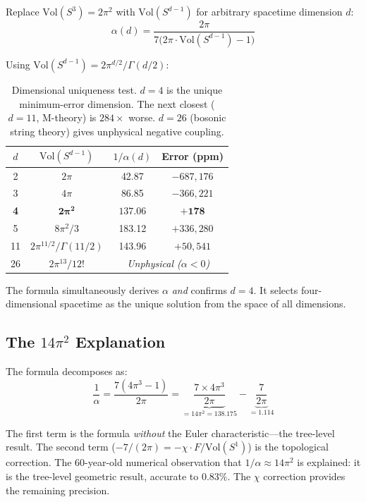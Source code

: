 \documentclass[12pt,a4paper]{article}
\theoremstyle{plain}
\theoremstyle{definition}
\begin{document}
Replace $\mathrm{Vol}(S^3) = 2\pi^2$ with $\mathrm{Vol}(S^{d-1})$ for arbitrary spacetime dimension $d$:
\begin{equation}
\alpha(d) = \frac{2\pi}{7\bigl(2\pi \cdot \mathrm{Vol}(S^{d-1}) - 1\bigr)}
\end{equation}

Using $\mathrm{Vol}(S^{d-1}) = 2\pi^{d/2}/\Gamma(d/2)$:

\begin{table}[H]
\centering
\begin{tabular}{cccc}
\toprule
$d$ & $\mathrm{Vol}(S^{d-1})$ & $1/\alpha(d)$ & Error (ppm) \\
\midrule
2 & $2\pi$ & 42.87 & $-687{,}176$ \\
3 & $4\pi$ & 86.85 & $-366{,}221$ \\
\textbf{4} & $\mathbf{2\pi^2}$ & $\mathbf{137.06}$ & $\mathbf{+178}$ \\
5 & $8\pi^2/3$ & 183.12 & $+336{,}280$ \\
11 & $2\pi^{11/2}/\Gamma(11/2)$ & 143.96 & $+50{,}541$ \\
26 & $2\pi^{13}/12!$ & \multicolumn{2}{c}{\textit{Unphysical ($\alpha < 0$)}} \\
\bottomrule
\end{tabular}
\caption{Dimensional uniqueness test. $d = 4$ is the unique minimum-error dimension. The next closest ($d = 11$, M-theory) is $284\times$ worse. $d = 26$ (bosonic string theory) gives unphysical negative coupling.}
\label{tab:dim-unique}
\end{table}

The formula simultaneously derives $\alpha$ \emph{and} confirms $d = 4$. It selects four-dimensional spacetime as the unique solution from the space of all dimensions.

\subsection{The $14\pi^2$ Explanation}

The formula decomposes as:
\begin{equation}
\frac{1}{\alpha} = \frac{7(4\pi^3 - 1)}{2\pi} = \underbrace{\frac{7 \times 4\pi^3}{2\pi}}_{= 14\pi^2 = 138.175} - \underbrace{\frac{7}{2\pi}}_{= 1.114}
\end{equation}

The first term is the formula \emph{without} the Euler characteristic---the tree-level result. The second term ($-7/(2\pi) = -\chi \cdot F / \mathrm{Vol}(S^1)$) is the topological correction. The 60-year-old numerical observation that $1/\alpha \approx 14\pi^2$ is explained: it is the tree-level geometric result, accurate to $0.83\%$. The $\chi$ correction provides the remaining precision.
\end{document}
